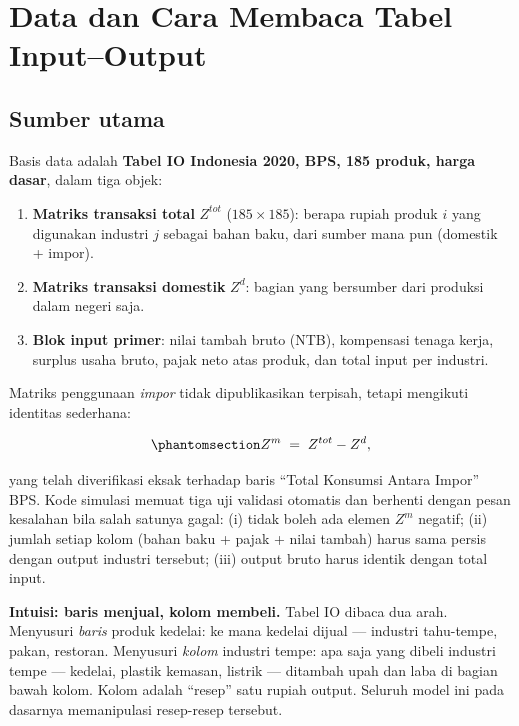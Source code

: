 \documentclass[
  manuscript=article,
  layout=publish,
  year=2026,
  volume=1,
]{den}
\providecommand{\tightlist}{%
  \setlength{\itemsep}{0pt}\setlength{\parskip}{0pt}}
\begin{document}
\section{Data dan Cara Membaca Tabel
Input--Output}\label{data-dan-cara-membaca-tabel-inputoutput}

\subsection{Sumber utama}\label{sumber-utama}

Basis data adalah \textbf{Tabel IO Indonesia 2020, BPS, 185 produk,
harga dasar}, dalam tiga objek:

\begin{enumerate}
\def\labelenumi{\arabic{enumi}.}
\tightlist
\item
  \textbf{Matriks transaksi total} \(Z^{tot}\) (\(185 \times 185\)):
  berapa rupiah produk \(i\) yang digunakan industri \(j\) sebagai bahan
  baku, dari sumber mana pun (domestik + impor).
\item
  \textbf{Matriks transaksi domestik} \(Z^{d}\): bagian yang bersumber
  dari produksi dalam negeri saja.
\item
  \textbf{Blok input primer}: nilai tambah bruto (NTB), kompensasi
  tenaga kerja, surplus usaha bruto, pajak neto atas produk, dan total
  input per industri.
\end{enumerate}

Matriks penggunaan \emph{impor} tidak dipublikasikan terpisah, tetapi
mengikuti identitas sederhana:

\begin{equation}\phantomsection\label{eq-zm}{
Z^{m} \;=\; Z^{tot} - Z^{d},
}\end{equation}

yang telah diverifikasi eksak terhadap baris ``Total Konsumsi Antara
Impor'' BPS. Kode simulasi memuat tiga uji validasi otomatis dan
berhenti dengan pesan kesalahan bila salah satunya gagal: (i) tidak
boleh ada elemen \(Z^m\) negatif; (ii) jumlah setiap kolom (bahan baku +
pajak + nilai tambah) harus sama persis dengan output industri tersebut;
(iii) output bruto harus identik dengan total input.

\begin{intuisi}

\textbf{Intuisi: baris menjual, kolom membeli.} Tabel IO dibaca dua
arah. Menyusuri \emph{baris} produk kedelai: ke mana kedelai dijual ---
industri tahu-tempe, pakan, restoran. Menyusuri \emph{kolom} industri
tempe: apa saja yang dibeli industri tempe --- kedelai, plastik kemasan,
listrik --- ditambah upah dan laba di bagian bawah kolom. Kolom adalah
``resep'' satu rupiah output. Seluruh model ini pada dasarnya
memanipulasi resep-resep tersebut.

\end{intuisi}
\end{document}
